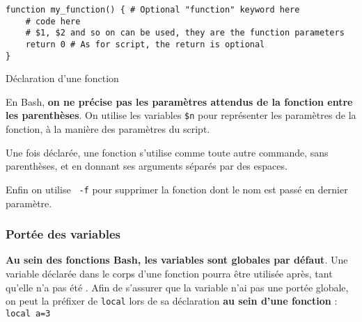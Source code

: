 \begin{code}
\begin{verbatim}
function my_function() { # Optional "function" keyword here
    # code here
    # $1, $2 and so on can be used, they are the function parameters
    return 0 # As for script, the return is optional
}
\end{verbatim}
\vspace{-5mm}
\caption{Déclaration d'une fonction}
    \label{code:function}
\end{code}

 En Bash, \textbf{on ne précise pas les paramètres attendus de la fonction entre les parenthèses}. On utilise les variables \texttt{\$n} pour représenter les paramètres de la fonction, à la manière des paramètres du script.

Une fois déclarée, une fonction s'utilise comme toute autre commande, sans parenthèses, et en donnant ses arguments séparés par des espaces.

Enfin on utilise \texttt{ -f} pour supprimer la fonction dont le nom est passé en dernier paramètre.


\subsubsection{Portée des variables}
\textbf{Au sein des fonctions Bash, les variables sont globales par défaut}. Une variable déclarée dans le corps d'une fonction pourra être utilisée après, tant qu'elle n'a pas été .
Afin de s'assurer que la variable n'ai pas une portée globale, on peut la préfixer de \texttt{local} lors de sa déclaration \textbf{au sein d'une fonction} : \texttt{local a=3}

